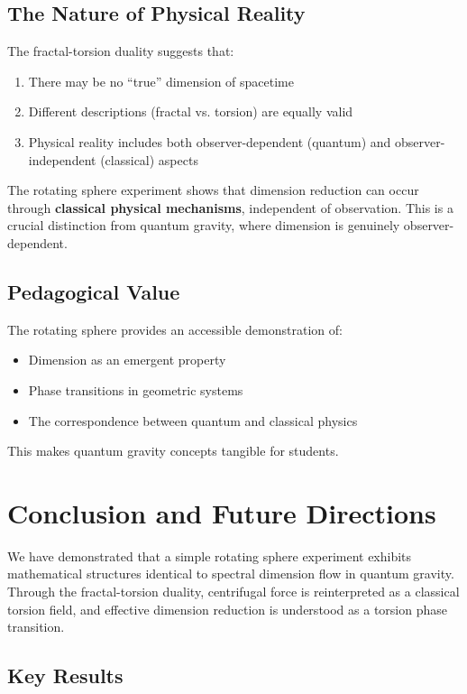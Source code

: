 \documentclass[UTF8]{ctex}\n\documentclass[12pt,a4paper]{article}
\begin{document}
\subsection{The Nature of Physical Reality}

The fractal-torsion duality suggests that:
\begin{enumerate}
    \item There may be no ``true'' dimension of spacetime
    \item Different descriptions (fractal vs. torsion) are equally valid
    \item Physical reality includes both observer-dependent (quantum) and observer-independent (classical) aspects
\end{enumerate}

The rotating sphere experiment shows that dimension reduction can occur through \textbf{classical physical mechanisms}, independent of observation. This is a crucial distinction from quantum gravity, where dimension is genuinely observer-dependent.

\subsection{Pedagogical Value}

The rotating sphere provides an accessible demonstration of:
\begin{itemize}
    \item Dimension as an emergent property
    \item Phase transitions in geometric systems
    \item The correspondence between quantum and classical physics
\end{itemize}

This makes quantum gravity concepts tangible for students.

\section{Conclusion and Future Directions}
\label{sec:conclusion}

We have demonstrated that a simple rotating sphere experiment exhibits mathematical structures identical to spectral dimension flow in quantum gravity. Through the fractal-torsion duality, centrifugal force is reinterpreted as a classical torsion field, and effective dimension reduction is understood as a torsion phase transition.

\subsection{Key Results}
\end{document}
